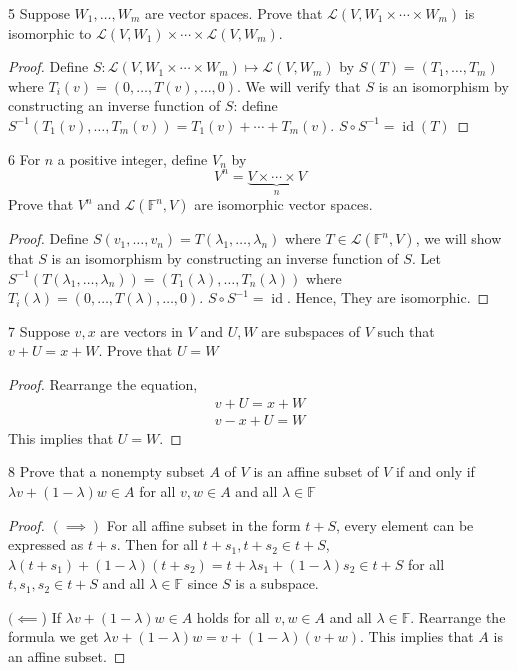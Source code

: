 \documentclass{article}
\newenvironment{problem}[1]{\begin{prob*}{#1}{}}{\end{prob*}}
\begin{document}
\begin{problem}{5}
Suppose $W_1, \ldots , W_m$ are vector spaces. Prove that $\mathcal{L}(V, W_1 \times \cdots \times W_m)$ is isomorphic to $\mathcal{L}(V, W_1) \times \cdots \times \mathcal{L}(V, W_m)$.
\end{problem}
\begin{proof}
Define $S: \mathcal{L}(V, W_1\times \cdots\times W_m) \mapsto \mathcal{L}(V,W_m)$ by $S(T) = (T_1, \ldots ,T_m)$ where $T_i(v) = (0, \ldots ,T(v), \ldots ,0)$. We will verify that $S$ is an isomorphism by constructing an inverse function of $S$: define
$S^{-1} (T_1(v), \ldots , T_m(v)) = T_1(v) + \cdots + T_m(v)$. $S \circ S^{-1} = \operatorname{id}(T)$
\end{proof}

\begin{problem}{6}
For $n $ a positive integer, define $V_n $ by \[
	V^n = \underbrace{ V \times \cdots \times V }_{n}\]
Prove that $V^n$ and $\mathcal{L}(\mathbb{F}^n, V)$ are isomorphic vector spaces.
\end{problem}
\begin{proof}
Define $S(v_1, \ldots ,v_n) = T(\lambda_1, \ldots , \lambda_n)$ where $T \in \mathcal{L}(\mathbb{F}^n, V)$, we will show that $S$ is an isomorphism by constructing an inverse function of $S$. Let $S^{-1} (T(\lambda_1, \ldots ,\lambda_n)) = (T_1(\lambda), \ldots , T_n(\lambda))$ where $T_i(\lambda) = (0, \ldots, T(\lambda), \ldots , 0)$. $S \circ S^{-1} = \operatorname{id}$. Hence, They are isomorphic.
\end{proof}

\begin{problem}{7}
Suppose $v,x$ are vectors in $V$ and $U, W$ are subspaces of $V$ such that $v + U = x + W$. Prove that $U = W$
\end{problem}
\begin{proof}
Rearrange the equation,
\begin{align*}
v + U = x + W \\
v - x + U = W
\end{align*}
This implies that $U = W$.
\end{proof}

\begin{problem}{8}
Prove that a nonempty subset $A $ of $V$ is an affine subset of $V$ if and only if
$\lambda v + (1 - \lambda)w \in A$ for all $v, w \in A$ and all $\lambda \in \mathbb{F}$
\end{problem}
\begin{proof}
$(\implies)$ For all affine subset in the form $t + S$, every element can be expressed as $t + s$. Then for all $t + s_1, t + s_2 \in t + S$, $\lambda (t + s_1) + (1 - \lambda)(t + s_2) = t + \lambda s_1 + (1 - \lambda)s_2 \in t + S$ for all $t, s_1, s_2 \in t + S$ and all $\lambda \in \mathbb{F}$ since $S $ is a subspace. \par
$(\impliedby$) If $\lambda v + (1 - \lambda)w \in A$ holds for all $v, w \in A$ and all $\lambda \in \mathbb{F}$. Rearrange the formula we get $\lambda v + (1 - \lambda)w = v + (1 - \lambda)(v+w)$. This implies that $A$ is an affine subset.
\end{proof}
\end{document}
